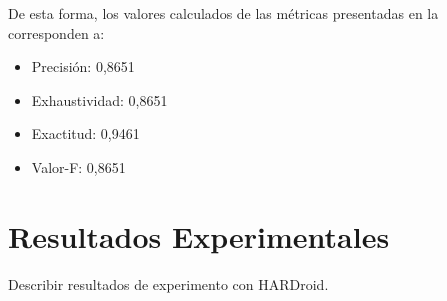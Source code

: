 De esta forma, los valores calculados de las métricas presentadas
en la  corresponden a:
\begin{itemize}
\item Precisión: 0,8651
\item Exhaustividad: 0,8651
\item Exactitud: 0,9461
\item Valor-F: 0,8651
\end{itemize}

\section{Resultados Experimentales}

\label{sec6:resultados}Describir resultados de experimento con HARDroid.

